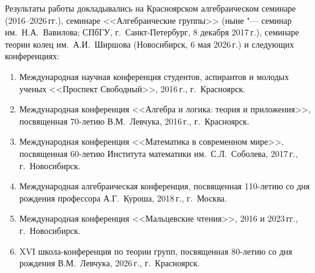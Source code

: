 {\probation} Результаты работы докладывались на Красноярском алгебраическом
семинаре (2016--2026\,гг.), семинаре
<<Алгебраические группы>> (ныне "--- семинар им.~Н.\nobreak\:А.~Вавилова;
СПбГУ, г.~Санкт-Петербург, 8 декабря 2017\,г.), семинаре теории колец
им.~А.\:И.~Ширшова (Новосибирск, 6 мая 2026\,г.) и следующих конференциях:
\begin{enumerate}
    \item Международная научная конференция студентов, аспирантов и молодых ученых
          <<Проспект Свободный>>, 2016\,г., г.~Красноярск.
    \item Международная конференция <<Алгебра и логика: теория и приложения>>,
          посвященная 70-летию В.\:М.~Левчука, 2016\,г., г.~Красноярск.
    \item Международная конференция <<Математика в современном мире>>, посвященная
          60-летию Института математики им.~С.\:Л.~Соболева, 2017\,г., г.~Новосибирск.
    \item Международная алгебраическая конференция, посвященная 110-летию со дня рождения
          профессора А.\:Г.~Куроша, 2018\,г., г.~Москва.
    \item Международная конференция <<Мальцевские чтения>>, 2016 и 2023\,гг.,
          г.~Новосибирск.
    \item XVI школа-конференция по теории групп, посвященная 80-летию со дня рождения
          В.\:М.~Левчука, 2026\,г., г.~Красноярск.
\end{enumerate}

